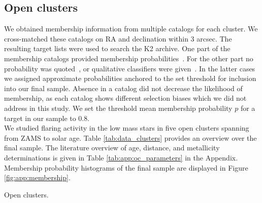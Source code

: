 \documentclass{aa}
\begin{document}
\subsection{Open clusters}
We obtained membership information from multiple catalogs for each cluster. We cross-matched these catalogs on RA and declination within 3 arcsec. The resulting target lists were used to search the K2 archive. One part of the membership catalogs provided membership probabilities~\citep{douglas_praesepe_hyades_2014, cantat_gaudin_2018, olivares_pleiades_2018, reino_hyades_2018, gao_m67mem_2018, olivares_ngc6774_2019}. For the other part no probability was quoted~\citep{rebull_rotation_2016, douglas_poking_2017, gaia_dr2_2018_hrd}, or qualitative classifiers were given~\citep{curtis_ruprecht_2013, gonzalez_m67mem_2016,rebull_praesepe_2017}. In the latter cases we assigned approximate probabilities anchored to the set threshold for inclusion into our final sample. Absence in a catalog did not decrease the likelihood of membership, as each catalog shows different selection biases which we did not address in this study. We set the threshold mean membership probability $p$ for a target in our sample to 0.8.
\\
We studied flaring activity in the low mass stars in five open clusters spanning from ZAMS to solar age. Table \ref{tab:data_clusters} provides an overview over the final sample. The literature overview of age, distance, and metallicity determinations is given in Table \ref{tab:app:oc_parameters} in the Appendix. Membership probability histograms of the final sample are displayed in Figure \ref{fig:app:membership}.
\begin{table}
\caption{Open clusters.}
\label{tab:data_clusters}
\centering

\end{table}
\end{document}
